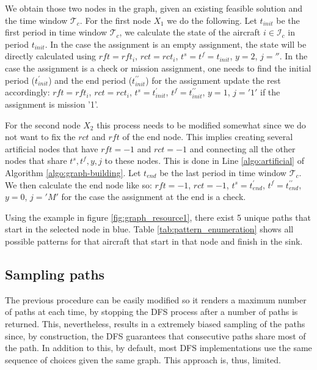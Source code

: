 \documentclass[a4paper,11pt]{article}
\begin{document}
    We obtain those two nodes in the graph, given an existing feasible solution and the time window $\mathcal{T}_{c}$.
    For the first node $X_1$ we do the following. Let $t_{init}$ be the first period in time window $\mathcal{T}_{c}$, we calculate the state of the aircraft $i \in \mathcal{I}_{c}$ in period $t_{init}$. In the case the assignment is an empty assignment, the state will be directly calculated using $rft=rft_i$, $rct=rct_i$, $t^s=t^f=t_{init}$, $y=2$, $j=''$. In the case the assignment is a check or mission assignment, one needs to find the initial period ($t^\prime_{init}$) and the end period ($t^{\prime\prime}_{init}$) for the assignment update the rest accordingly: $rft=rft_i$, $rct=rct_i$, $t^s=t^\prime_{init}$, $t^f=t^{\prime\prime}_{init}$, $y=1$, $j='1'$ if the assignment is mission '1'.

    For the second node $X_2$ this process needs to be modified somewhat since we do not want to fix the $rct$ and $rft$ of the end node. This implies creating several artificial nodes that have $rft=-1$ and $rct=-1$ and connecting all the other nodes that share $t^s, t^f, y, j$ to these nodes. This is done in Line \ref{algo:artificial} of Algorithm \ref{algo:graph-building}. Let $t_{end}$ be the last period in time window $\mathcal{T}_{c}$. We then calculate the end node like so: $rft=-1$, $rct=-1$, $t^s=t^\prime_{end}$, $t^f=t^{\prime\prime}_{end}$, $y=0$, $j='M'$ for the case the assignment at the end is a check.

    Using the example in figure \ref{fig:graph_resource1}, there exist 5 unique paths that start in the selected node in blue. Table \ref{tab:pattern_enumeration} shows all possible patterns for that aircraft that start in that node and finish in the sink.

    

  \subsection{Sampling paths}
    \label{sec:sampling}

    The previous procedure can be easily modified so it renders a maximum number of paths at each time, by stopping the DFS process after a number of paths is returned. This, nevertheless, results in a extremely biased sampling of the paths since, by construction, the DFS guarantees that consecutive paths share most of the path. In addition to this, by default, most DFS implementations use the same sequence of choices given the same graph. This approach is, thus, limited.
\end{document}
